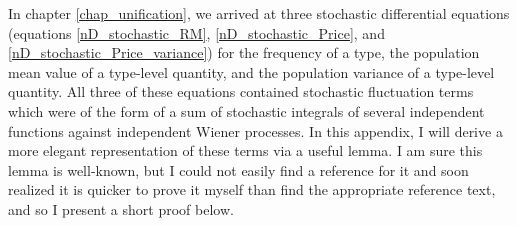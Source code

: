 In chapter \ref{chap_unification}, we arrived at three stochastic differential equations (equations \eqref{nD_stochastic_RM}, \eqref{nD_stochastic_Price}, and  \eqref{nD_stochastic_Price_variance}) for the frequency of a type, the population mean value of a type-level quantity, and the population variance of a type-level quantity. All three of these equations contained stochastic fluctuation terms which were of the form of a sum of stochastic integrals of several independent functions against independent Wiener processes. In this appendix, I will derive a more elegant representation of these terms via a useful lemma. I am sure this lemma is well-known, but I could not easily find a reference for it and soon realized it is quicker to prove it myself than find the appropriate reference text, and so I present a short proof below.

